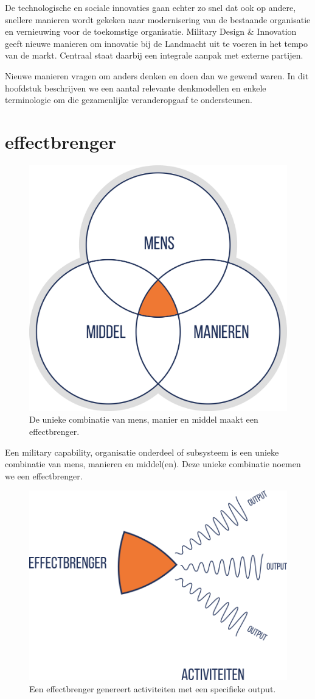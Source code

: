 \documentclass[
]{book}
\begin{document}
De technologische en sociale innovaties gaan echter zo snel dat ook op andere, snellere manieren wordt gekeken naar modernisering van de bestaande organisatie en vernieuwing voor de toekomstige organisatie. Military Design \& Innovation geeft nieuwe manieren om innovatie bij de Landmacht uit te voeren in het tempo van de markt. Centraal staat daarbij een integrale aanpak met externe partijen.

Nieuwe manieren vragen om anders denken en doen dan we gewend waren. In dit hoofdstuk beschrijven we een aantal relevante denkmodellen en enkele terminologie om die gezamenlijke veranderopgaaf te ondersteunen.

\hypertarget{effectbrenger}{%
\section{effectbrenger}\label{effectbrenger}}

\begin{figure}

{\centering \includegraphics[width=0.35\linewidth]{data/images/20210324-MDI-mmm-model} 

}

\caption{De unieke combinatie van mens, manier en middel maakt een effectbrenger.}\label{fig:mmm-model}
\end{figure}

Een military capability, organisatie onderdeel of subsysteem is een unieke combinatie van mens, manieren en middel(en). Deze unieke combinatie noemen we een effectbrenger.

\begin{figure}

{\centering \includegraphics[width=0.45\linewidth]{data/images/20210324-MDI-effectbrenger} 

}

\caption{Een effectbrenger genereert activiteiten met een specifieke output.}\label{fig:effectbrenger}
\end{figure}
\end{document}
